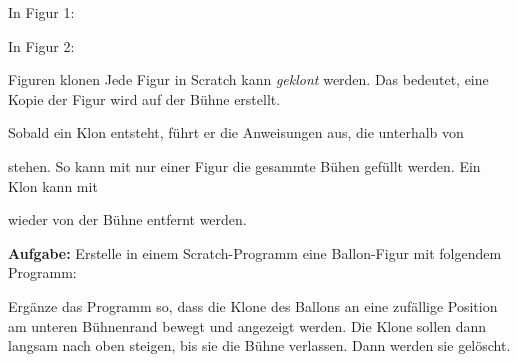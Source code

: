 \documentclass[lerntheke,12pt,a5paper,landscape]{arbeitsblatt}
\newenvironment{inlinescratch}{\begin{scratch}[scale=0.6]}{\end{scratch}}
\begin{document}
\begin{loesungskarte}
	\begin{multicols}{2}
		In Figur 1:

		\begin{scratch}[scale=0.7]
		\end{scratch}

		\begin{scratch}[scale=0.7]
		\end{scratch}
		\columnbreak

		In Figur 2:

		\begin{scratch}[scale=0.7]
		\end{scratch}

		\begin{scratch}[scale=0.7]
		\end{scratch}
	\end{multicols}
\end{loesungskarte}

\begin{karte2}{Figuren klonen}
Jede Figur in Scratch kann \emph{geklont} werden. Das bedeutet, eine Kopie der Figur wird auf der Bühne erstellt.

Sobald ein Klon entsteht, führt er die Anweisungen aus, die unterhalb von \begin{inlinescratch}\end{inlinescratch} stehen. So kann mit nur einer Figur die gesammte Bühen gefüllt werden. Ein Klon kann mit \begin{inlinescratch}\end{inlinescratch} wieder von der Bühne entfernt werden.

\textbf{Aufgabe:} Erstelle in einem Scratch-Programm eine Ballon-Figur mit folgendem Programm:

\begin{scratch}[scale=0.7]
\end{scratch}
\smallskip

Ergänze das Programm so, dass die Klone des Ballons an eine zufällige Position am unteren Bühnenrand bewegt und angezeigt werden. Die Klone sollen dann langsam nach oben steigen, bis sie die Bühne verlassen. Dann werden sie gelöscht.
\end{karte2}
\end{document}
